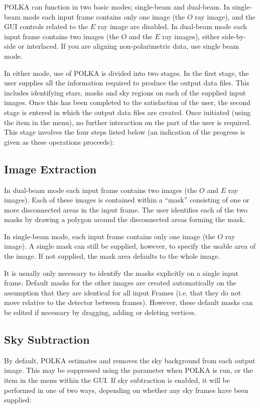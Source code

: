POLKA can function in two basic modes; single-beam and dual-beam. In
single-beam mode each input frame contains only one image (the $O$ ray
image), and the GUI controls related to the $E$ ray image are
disabled. In dual-beam mode each input frame contains two images (the $O$
and the $E$ ray images), either side-by-side or interlaced. If you are
aligning non-polarimetric data, use single beam mode. 

In either mode, use of POLKA is divided into two stages. In the first
stage, the user supplies all the information required to produce the
output data files. This includes identifying stars, masks and sky regions
on each of the supplied input images. Once this has been completed to the
satisfaction of the user, the second stage is entered in which the output
data files are created. Once initiated (using the  item in the 
menu), no further interaction on the part of the user is required. This
stage involves the four steps listed below (an indication of the progress
is given as these operations proceeds):

\subsection{Image Extraction}
In dual-beam mode each input frame contains two images (the $O$ and $E$
ray images). Each of these images is contained within a ``mask''
consisting of one or more disconnected areas in the input frame. The user
identifies each of the two masks by drawing a polygon around the
disconnected areas forming the mask.

In single-beam mode, each input frame contains only one image (the $O$
ray image). A single mask can still be supplied, however, to specify the
usable area of the image. If not supplied, the mask area defaults to the 
whole image.

It is usually only necessary to identify the masks explicitly on a single
input frame. Default masks for the other images are created automatically 
on the assumption that they are identical for all input Frames (i.e. that
they do not move relative to the detector between frames). However, these 
default masks can be edited if necessary by dragging, adding or deleting 
vertices.

\subsection {Sky Subtraction}
By default, POLKA estimates and removes the sky background from each
output image. This may be suppressed using the
 parameter when POLKA is run, or the
 item in the  menu within the GUI. If sky subtraction is
enabled, it will be performed in one of two ways, depending on whether
any sky frames have been supplied:

